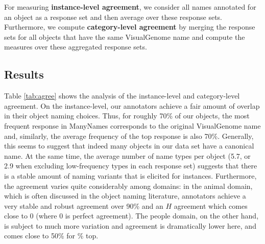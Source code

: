 For measuring \textbf{instance-level agreement}, we consider all names annotated for an object as a response set and then average over these response sets. Furthermore, we compute \textbf{category-level agreement} by merging the response sets for all objects that have the same VisualGenome name and compute the measures over these aggregated response sets.

\subsection{Results}

Table \ref{tab:agree} shows the analysis of the instance-level and category-level agreement.
On the instance-level, our annotators achieve a fair amount of overlap in their object naming choices. Thus, for roughly 70\% of our objects, the most frequent response in ManyNames corresponds to the original VisualGenome name and, similarly, the average frequency of the top response is also 70\%. Generally, this seems to suggest that indeed many objects in our data set have a canonical name. At the same time, the average number of name types per object (5.7, or 2.9 when excluding low-frequency types in each response set) suggests that there is a stable amount of naming variants that is elicited for instances. Furthermore, the agreement varies quite considerably among domains:  in the animal domain, which is often discussed in the object naming literature, annotators achieve a very stable and robust agreement over 90\% and an $H$ agreement which comes close to 0 (where 0 is perfect agreement). 
The people domain, on the other hand, is subject to much more variation and agreement is dramatically lower here, and comes close to 50\% for \% top.

